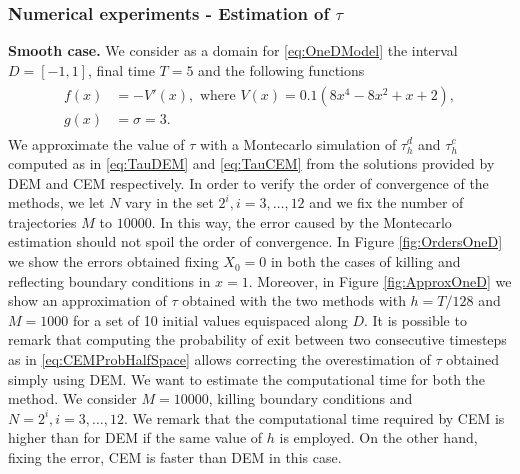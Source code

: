 \subsubsection{Numerical experiments - Estimation of $\tau$}

\textbf{Smooth case.} We consider as a domain for \eqref{eq:OneDModel} the interval $D = \left[-1,1\right]$, final time $T = 5$ and the following functions
\begin{align}\label{eq:FunctionsOneDSmooth}
\begin{split}
	f(x) &= -V'(x), \text{ where } V(x) = 0.1(8x^4 - 8x^2 + x + 2), \\
	g(x) &= \sigma = 3.
\end{split}
\end{align}
We approximate the value of $\tau$ with a Montecarlo simulation of $\tau_h^d$ and $\tau_h^c$ computed as in \eqref{eq:TauDEM} and \eqref{eq:TauCEM} from the solutions provided by DEM and CEM respectively. In order to verify the order of convergence of the methods, we let $N$ vary in the set $2^i,i=3,\dots,12$ and we fix the number of trajectories $M$ to $10000$. In this way, the error caused by the Montecarlo estimation should not spoil the order of convergence. In Figure \ref{fig:OrdersOneD} we show the errors obtained fixing $X_0 = 0$ in both the cases of killing and reflecting boundary conditions in $x = 1$. Moreover, in Figure \ref{fig:ApproxOneD} we show an approximation of $\tau$ obtained with the two methods with $h = T/128$ and $M = 1000$ for a set of 10 initial values equispaced along $D$. It is possible to remark that computing the probability of exit between two consecutive timesteps as in \eqref{eq:CEMProbHalfSpace} allows correcting the overestimation of $\tau$ obtained simply using DEM. We want to estimate the computational time for both the method. We consider $M = 10000$, killing boundary conditions and $N = 2^i, i = 3,\dots,12$. We remark that the computational time required by CEM is higher than for DEM if the same value of $h$ is employed. On the other hand, fixing the error, CEM is faster than DEM in this case.



